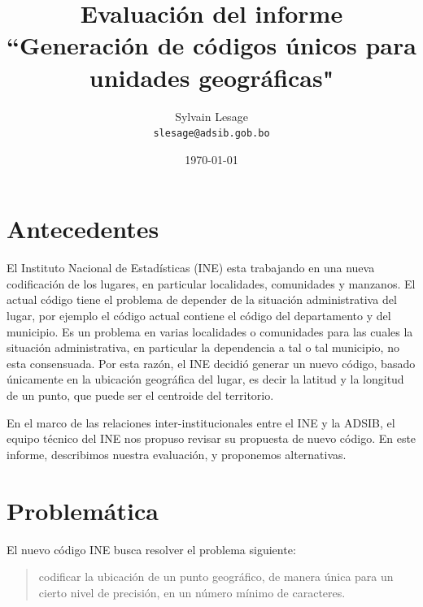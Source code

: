 \documentclass[letterpaper]{article}
\begin{document}
\title{Evaluación del informe\\``Generación de códigos únicos para
unidades geográficas"}
\author{Sylvain Lesage\\
\texttt{slesage@adsib.gob.bo}}
\date{\today}
\maketitle

\section{Antecedentes}

El Instituto Nacional de Estadísticas (INE) esta trabajando en una 
nueva codificación de los lugares, en particular localidades, 
comunidades y manzanos. El actual código tiene el problema de depender 
de la situación administrativa del lugar, por ejemplo el código 
actual contiene el código del departamento y del municipio. Es un 
problema en varias localidades o comunidades para las cuales la 
situación administrativa, en particular la dependencia a tal o tal 
municipio, no esta consensuada. Por esta razón, el INE decidió 
generar un nuevo código, basado únicamente en la ubicación 
geográfica del lugar, es decir la latitud y la longitud de un punto, 
que puede ser el centroide del territorio.

En el marco de las relaciones inter-institucionales entre el INE y la 
ADSIB, el equipo técnico del INE nos propuso revisar su propuesta de 
nuevo código. En este informe, describimos nuestra evaluación, y 
proponemos alternativas.

\section{Problemática}
\label{sec:problematica}

El nuevo código INE busca resolver el problema siguiente:

\begin{quote}
codificar la ubicación de un punto geográfico, de manera única para
un cierto nivel de precisión, en un número mínimo de caracteres.
\end{quote}
\end{document}
